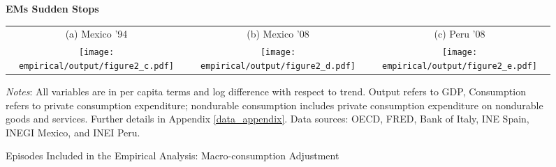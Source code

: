 \documentclass[12pt]{article}
\begin{document}
\begin{spacing}{1.5}
\begin{figure}[H]
{\bf EMs Sudden Stops}\\\medskip
\begingroup
\setlength{\tabcolsep}{1pt} 
\renewcommand{\arraystretch}{1}
\begin{tabular}{ccc}
{\footnotesize{}{(a) Mexico '94} } & {\footnotesize{}{(b) Mexico '08} } & { \footnotesize{}{(c) Peru '08} }\vspace{.5em} \tabularnewline
\texttt{[image: empirical/output/figure2\_c.pdf]} & 
\texttt{[image: empirical/output/figure2\_d.pdf]}   &
\texttt{[image: empirical/output/figure2\_e.pdf]}
\end{tabular}
\endgroup
\caption{Episodes Included in the Empirical Analysis: Macro-consumption Adjustment
\label{fig_episodes}}
\medskip{}

\raggedright{}\textit{\footnotesize{}Notes}{\footnotesize{}:
All variables are in per capita terms and log difference with respect to trend. Output refers to GDP, Consumption refers to private consumption expenditure; nondurable consumption includes private consumption expenditure on nondurable goods and services. Further details in Appendix \ref{data_appendix}. Data sources: OECD, FRED, Bank of Italy, INE Spain, INEGI Mexico, and INEI Peru. }{\footnotesize\par}
\end{figure}


\end{spacing}
\end{document}
